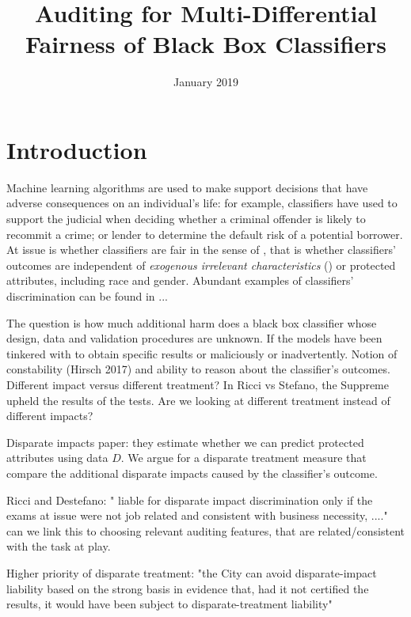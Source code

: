 \documentclass{article}
\title{Auditing for Multi-Differential Fairness of Black Box Classifiers}
\author{}
\date{January 2019}
\begin{document}
\maketitle
\section{Introduction}
Machine learning algorithms are used to make support decisions that have adverse consequences on an individual's life: for example, classifiers have used to support the judicial when deciding whether a criminal offender is likely to recommit a crime; or lender to determine the default risk of a potential borrower. At issue is whether classifiers are fair in the sense of \cite{calsamiglia2009decentralizing} , that is whether classifiers' outcomes are independent of \textit{exogenous irrelevant characteristics} (\cite{calsamiglia2009decentralizing}) or protected attributes, including race and gender. Abundant examples of classifiers' discrimination can be found in ... 

\bigskip
The question is how much additional harm does a black box classifier whose design, data and validation procedures are unknown. If the models have been tinkered with to obtain specific results or maliciously or inadvertently. Notion of constability (Hirsch 2017) and ability to reason about the classifier's outcomes. Different impact versus different treatment? In Ricci vs Stefano, the Suppreme upheld the results of the tests. Are we looking at different treatment instead of different impacts?

Disparate impacts paper: they estimate whether we can predict protected attributes using data $D$. We argue for a disparate treatment measure that compare the additional disparate impacts caused by the classifier's outcome. 

\bigskip
Ricci and Destefano: " liable for disparate impact discrimination only if the exams at issue were not job related and consistent with business necessity, ...." can we link this to choosing relevant auditing features, that are related/consistent with the task at play.

Higher priority of disparate treatment: "the City can avoid disparate-impact liability based on
the strong basis in evidence that, had it not certified the results, it
would have been subject to disparate-treatment liability"
\end{document}
